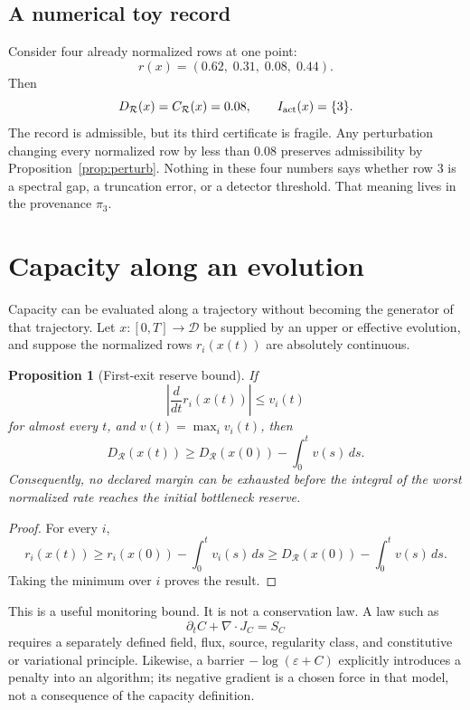 \documentclass[11pt]{article}
\newtheorem{proposition}[theorem]{Proposition}
\theoremstyle{definition}
\theoremstyle{remark}
\newcommand{\cD}{\mathcal D}
\newcommand{\cR}{\mathcal R}
\begin{document}
\subsection{A numerical toy record}

Consider four already normalized rows at one point:
\[
 r(x)=(0.62,\;0.31,\;0.08,\;0.44).
\]
Then
\[
 D_{\cR}(x)=C_{\cR}(x)=0.08,
\qquad
 I_{\rm act}(x)=\{3\}.
\]
The record is admissible, but its third certificate is fragile.  Any
perturbation changing every normalized row by less than \(0.08\) preserves
admissibility by Proposition~\ref{prop:perturb}.  Nothing in these four numbers says
whether row 3 is a spectral gap, a truncation error, or a detector
threshold.  That meaning lives in the provenance \(\pi_3\).

\section{Capacity along an evolution}
\label{sec:dynamics}

Capacity can be evaluated along a trajectory without becoming the generator
of that trajectory.  Let \(x:[0,T]\to\cD\) be supplied by an upper or
effective evolution, and suppose the normalized rows
\(r_i(x(t))\) are absolutely continuous.

\begin{proposition}[First-exit reserve bound]
\label{prop:path}
If
\[
 \left|\frac{d}{dt}r_i(x(t))\right|\le v_i(t)
\]
for almost every \(t\), and \(v(t)=\max_i v_i(t)\), then
\[
 D_{\cR}(x(t))
 \ge
 D_{\cR}(x(0))-\int_0^t v(s)\,ds.
\]
Consequently, no declared margin can be exhausted before the integral of
the worst normalized rate reaches the initial bottleneck reserve.
\end{proposition}

\begin{proof}
For every \(i\),
\[
 r_i(x(t))
 \ge
 r_i(x(0))-\int_0^t v_i(s)\,ds
 \ge
 D_{\cR}(x(0))-\int_0^t v(s)\,ds.
\]
Taking the minimum over \(i\) proves the result.
\end{proof}

This is a useful monitoring bound.  It is not a conservation law.  A law
such as
\[
 \partial_t C+\nabla\cdot J_C=S_C
\]
requires a separately defined field, flux, source, regularity class, and
constitutive or variational principle.  Likewise, a barrier
\(-\log(\varepsilon+C)\) explicitly introduces a penalty into an algorithm;
its negative gradient is a chosen force in that model, not a consequence of
the capacity definition.
\end{document}
